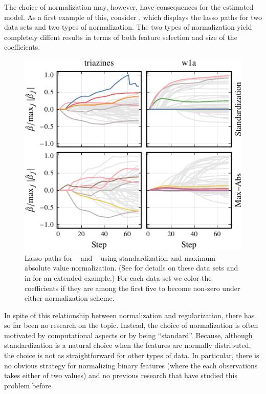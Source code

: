 The choice of normalization may, however, have consequences for the estimated model. As a
first example of this, consider , which displays the lasso paths
for two data sets and two types of normalization. The two types of normalization yield
completely diffent results in terms of both feature selection and size of the coefficients.

\begin{figure}[bpt]
  \centering
  \includegraphics[]{plots/realdata_paths_small.pdf}
  \caption{%
    Lasso paths for ~\citep{king} and
    ~\citep{platt1998} using standardization and maximum absolute
    value normalization. (See  for details
    on these data sets and  in
     for an extended example.) For each data
    set we color the coefficients if they are among the first five to become
    non-zero under either normalization scheme.
  }
  \label{fig:realdata-paths}
\end{figure}

In spite of this relationship between normalization and regularization, there has so far
been no research on the topic. Instead, the choice of normalization is often motivated by
computational aspects or by being ``standard''. Because, although standardization is a
natural choice when the features are normally distributed, the choice is not as
straightforward for other types of data. In particular, there is no obvious strategy for
normalizing binary features (where the each observations takes either of two values) and no
previous research that have studied this problem before.

